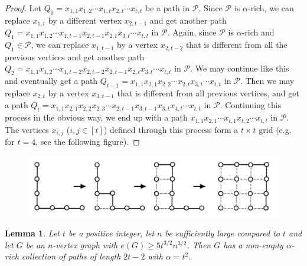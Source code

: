 \documentclass{article}
\newtheorem{lemma}[theorem]{Lemma}
\theoremstyle{definition}
\begin{document}
\begin{proof}
    Let $Q_0=x_{1,1}x_{1,2}\cdots x_{1,t}x_{2,t}\cdots x_{t,t}$ be a path in $\mathcal{P}$. Since $\mathcal{P}$ is $\alpha$-rich, we can replace $x_{1,t}$ by a different vertex $x_{2,{t-1}}$ and get another path $Q_1=x_{1,1}x_{1,2}\cdots x_{1,t-1}x_{2,t-1}x_{2,t}x_{3,t}\cdots x_{t,t}$ in $\mathcal{P}$. Again, since $\mathcal{P}$ is $\alpha$-rich and $Q_1\in \mathcal{P}$, we can replace $x_{1,t-1}$ by a vertex $x_{2,t-2}$ that is different from all the previous vertices and get another path $Q_2=x_{1,1}x_{1,2}\cdots x_{1,t-2}x_{2,t-2}x_{2,t-1}x_{2,t}x_{3,t}\cdots x_{t,t}$ in $\mathcal{P}$. We may continue like this and eventually get a path $Q_{t-1}=x_{1,1}x_{2,1}x_{2,2}\cdots x_{2,t}x_{3,t}\cdots x_{t,t}$ in $\mathcal{P}$. Then we may replace $x_{2,t}$ by a vertex $x_{3,t-1}$ that is different from all previous vertices, and get a path $Q_t=x_{1,1}x_{2,1}x_{2,2}x_{2,3}\cdots x_{2,t-1}x_{3,t-1}x_{3,t}x_{4,t}\cdots x_{t,t}$ in $\mathcal{P}$. Continuing this process in the obvious way, we end up with a path $x_{1,1}x_{2,1}\cdots x_{t,1}x_{t,2}\cdots x_{t,t}$ in $\mathcal{P}$. The vertices $x_{i,j}$ ($i,j\in [t]$) defined through this process form a $t\times t$ grid (e.g. for $t=4$, see the following figure).
\end{proof}

\begin{figure}[H]
     \centering
     \includegraphics[scale=0.15]{11-3.png}
\end{figure}

\begin{lemma}
    Let $t$ be a positive integer, let $n$ be sufficiently large compared to $t$ and let $G$ be an $n$-vertex graph with  $e(G)\geq 5t^{3/2}n^{3/2}$. Then $G$ has a non-empty $\alpha$-rich collection of paths of length $2t-2$ with $\alpha=t^2$.
\end{lemma}
\end{document}

